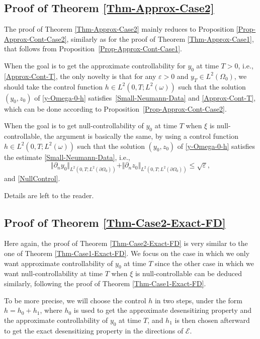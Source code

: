 \documentclass[11pt]{article}
\newcommand{\ie}{i.e.,\xspace}
\numberwithin{equation}{section}
\newcommand{\norm}[1]{\Vert#1\Vert}
\theoremstyle{definition}
\begin{document}
\subsection{Proof of Theorem \ref{Thm-Approx-Case2}}\label{Subsec-Proof-Approx-Case2}

The proof of Theorem \ref{Thm-Approx-Case2} mainly reduces to Proposition \ref{Prop-Approx-Cont-Case2}, similarly as for the proof of Theorem \ref{Thm-Approx-Case1}, that follows from Proposition~\ref{Prop-Approx-Cont-Case1}.

When the goal is to get the approximate controllability for $y_0$ at time $T>0$, \ie \eqref{Approx-Cont-T}, the only novelty is that for any $\varepsilon >0$ and $y_T\in L^2(\Omega_0)$, we should take the control function $h \in L^2(0,T; L^2(\omega))$ such that the solution $(y_0,z_0)$ of \eqref{y-Omega-0-h} satisfies~\eqref{Small-Neumann-Data} and \eqref{Approx-Cont-T}, which can be done according to Proposition~\ref{Prop-Approx-Cont-Case2}.

When the goal is to get null-controllability of $y_0$ at time $T$ when $\xi$ is null\nobreakdash-con\-trol\-lable, the argument is basically the same, by using a control function $h \in L^2(0,T; L^2(\omega))$ such that the solution $(y_0,z_0)$ of \eqref{y-Omega-0-h} satisfies the estimate \eqref{Small-Neumann-Data}, \ie
\[
\norm{\partial_n y_0}_{L^2(0,T;L^2(\partial\Omega_0))} + \norm{\partial_n z_0}_{L^2(0,T;L^2(\partial\Omega_0))}\leq \sqrt{\varepsilon}
,
\]
and \eqref{NullControl}.

Details are left to the reader.

\subsection{Proof of Theorem \ref{Thm-Case2-Exact-FD}}

Here again, the proof of Theorem \ref{Thm-Case2-Exact-FD} is very similar to the one of Theorem \ref{Thm-Case1-Exact-FD}. We focus on the case in which we only want approximate controllability of $y_0$ at time $T$ since the other case in which we want null-controllability at time $T$ when $\xi$ is null-controllable can be deduced similarly, following the proof of Theorem \ref{Thm-Case1-Exact-FD}.

{To be more precise, we will choose the control $h$ in two steps, under the form $h = h_0 + h_1$, where $h_0$ is used to get the approximate desensitizing property and the approximate controllability of $y_0$ at time $T$, and $h_1$ is then chosen afterward to get the exact desensitizing property in the directions of $\mathcal{E}$.}
\end{document}
